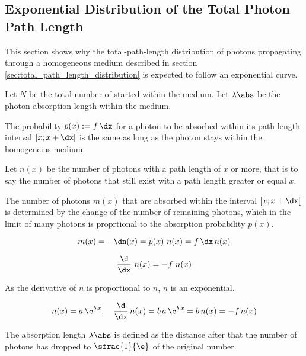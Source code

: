 
\subsection{Exponential Distribution of the Total Photon Path Length}
\label{sec:exponential_distribution}

This section shows why the total-path-length distribution of photons propagating through a homogeneous medium described in section \ref{sec:total_path_length_distribution} is expected to follow an exponential curve.


Let $N$ be the total number of started within the medium. Let $\lambda\abs$ be the photon absorption length within the medium.

The probability $p(x):=f\,\dx$ for a photon to be absorbed within its path length interval $[x; x + \dx[$ is the same as long as the photon stays within the homogeneius medium.

Let $n(x)$ be the number of photons with a path length of $x$ or more, that is to say the number of photons that still exist with a path length greater or equal $x$.

The number of photons $m(x)$ that are absorbed within the interval $[x; x + \dx[$ is determined by the change of the number of remaining photons, which in the limit of many photons is proprtional to the absorption probability $p(x)$.

$$ m(x) = -\dn(x) = p(x)\ n(x) = f\,\dx\,n(x) $$

$$ \frac{\d}{\dx}\ n(x) = -f\ n(x) $$

As the derivative of $n$ is proportional to $n$, $n$ is an exponential.

$$
  n(x) = a\,\e^{b\,x}, \ \ \
  \frac{\d}{\dx}\,n(x) = b\,a\,\e^{b\,x} = b\,n(x) = -f\,n(x)
$$

%

The absorption length $\lambda\abs$ is defined as the distance after that the number of photons has dropped to $\sfrac{1}{\e}$ of the original number.

